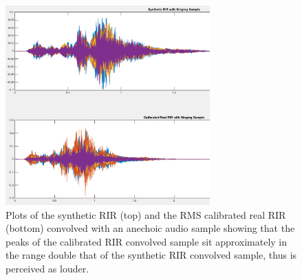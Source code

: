\documentclass[../../main.tex]{subfiles}
\begin{document}
			\begin{figure}[t]
				\begin{center}
					\includegraphics[width=0.7\textwidth]{Sections/Implementation/RealRIRs/images/calibration/CalRMS_Sing_edit.png} 
					\caption{Plots of the synthetic \ac{RIR} (top) and the RMS calibrated real \ac{RIR} (bottom) convolved with an anechoic audio sample showing that the peaks of the calibrated \ac{RIR} convolved sample sit approximately in the range double that of the synthetic \ac{RIR} convolved sample, thus is perceived as louder.}
					\label{calRMSsing}
				\end{center}
			\end{figure}
\end{document}
